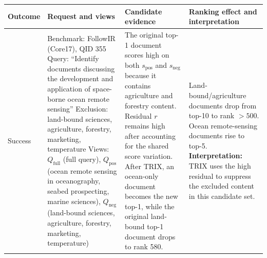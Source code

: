 \documentclass[letterpaper]{article}
\newcommand{\method}{\ifmmode \mathrm{TRIX}\else TRIX\xspace\fi}
\newcommand{\qbase}{Q_{\text{full}}}
\newcommand{\qpos}{Q_{\text{pos}}}
\newcommand{\qneg}{Q_{\text{neg}}}
\begin{document}
\begin{table}[t]
\centering
\small
\setlength{\tabcolsep}{4pt}
\renewcommand{\arraystretch}{1.05}
\begin{tabular}{p{}p{}p{}p{}}
\toprule
\textbf{Outcome} & \textbf{Request and views} & \textbf{Candidate evidence} &
\textbf{Ranking effect and interpretation} \\
\midrule
Success &
  Benchmark: FollowIR (Core17), QID 355
  \newline Query: ``Identify documents discussing the development and application of space-borne ocean remote sensing''
  \newline Exclusion: land-bound sciences, agriculture, forestry, marketing, temperature
  \newline Views: $\qbase$ (full query), $\qpos$ (ocean remote sensing in oceanography, seabed prospecting, marine sciences), $\qneg$ (land-bound sciences, agriculture, forestry, marketing, temperature) &
  The original top-1 document scores high on both $s_{\text{pos}}$ and
  $s_{\text{neg}}$ because it contains agriculture and forestry content.
  Residual $r$ remains high after accounting for the shared score variation.
  \newline After \method, an ocean-only document becomes the new top-1, while
  the original land-bound top-1 document drops to rank 580. &
  Land-bound/agriculture documents drop from top-10 to rank $>500$.
  \newline Ocean remote-sensing documents rise to top-5.
  \newline \textbf{Interpretation:} \method{} uses the high residual to suppress the excluded content in this candidate set. \\


\end{tabular}
\end{table}
\end{document}

